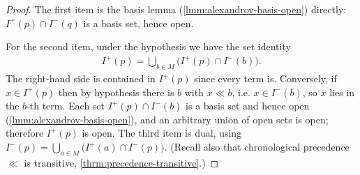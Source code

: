 \begin{proof}
    \leanok
    The first item is the basis lemma (\ref{lmm:alexandrov-basis-open}) directly: $I^+(p) \cap I^-(q)$ is a basis set, hence open.

    For the second item, under the hypothesis we have the set identity
    \begin{align}
        I^+(p) = \bigcup_{b \in M} \bigl(I^+(p) \cap I^-(b)\bigr).
    \end{align}
    The right-hand side is contained in $I^+(p)$ since every term is. Conversely, if $x \in I^+(p)$ then by hypothesis there is $b$ with $x \ll b$, i.e. $x \in I^-(b)$, so $x$ lies in the $b$-th term. Each set $I^+(p) \cap I^-(b)$ is a basis set and hence open (\ref{lmm:alexandrov-basis-open}), and an arbitrary union of open sets is open; therefore $I^+(p)$ is open. The third item is dual, using $I^-(p) = \bigcup_{a \in M} \bigl(I^+(a) \cap I^-(p)\bigr)$. (Recall also that chronological precedence $\ll$ is transitive, \ref{thrm:precedence-transitive}.)
\end{proof}

\medskip

